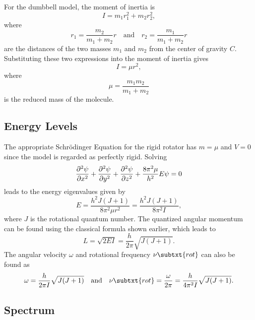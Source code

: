 For the dumbbell model, the moment of inertia is
\begin{equation*}
    I = m_1r_1^2 + m_2r_2^2,
\end{equation*}
where
\begin{equation*}
    r_1 = \frac{m_2}{m_1 + m_2}r \quad\text{and}\quad r_2 = \frac{m_1}{m_1 + m_2}r
\end{equation*}
are the distances of the two masses $m_1$ and $m_2$ from the center of gravity $C$. Substituting these two expressions into the moment of inertia gives
\begin{equation*}
    I = \mu r^2,
\end{equation*}
where
\begin{equation*}
    \mu = \frac{m_1m_2}{m_1 + m_2}
\end{equation*}
is the reduced mass of the molecule.

\subsection{Energy Levels}

The appropriate Schr\"odinger Equation for the rigid rotator has $m = \mu$ and $V = 0$ since the model is regarded as perfectly rigid. Solving
\begin{equation*}
    \pdv[2]{\psi}{x} + \pdv[2]{\psi}{y} + \pdv[2]{\psi}{z} + \frac{8\pi^2\mu}{h^2}E\psi = 0
\end{equation*}
leads to the energy eigenvalues given by
\begin{equation*}
    E = \frac{h^2J(J + 1)}{8\pi^2\mu r^2} = \frac{h^2J(J + 1)}{8\pi^2I},
\end{equation*}
where $J$ is the rotational quantum number. The quantized angular momentum can be found using the classical formula shown earlier, which leads to
\begin{equation*}
    L = \sqrt{2EI} = \frac{h}{2\pi}\sqrt{J(J + 1)}.
\end{equation*}
The angular velocity $\omega$ and rotational frequency $\nu\subtxt{rot}$ can also be found as
\begin{equation*}
    \omega = \frac{h}{2\pi I}\sqrt{J(J + 1)} \quad\text{and}\quad \nu\subtxt{rot} = \frac{\omega}{2\pi} = \frac{h}{4\pi^2I}\sqrt{J(J + 1)}.
\end{equation*}

\subsection{Spectrum}

